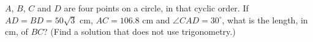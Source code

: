 $A$, $B$, $C$ and $D$ are four points on a circle, in that cyclic order. If $AD=BD=50\sqrt3$ cm, $AC=106.8$ cm and $\angle CAD=30^\circ$, what is the length, in cm, of $BC$? (Find a solution that does not use trigonometry.)
